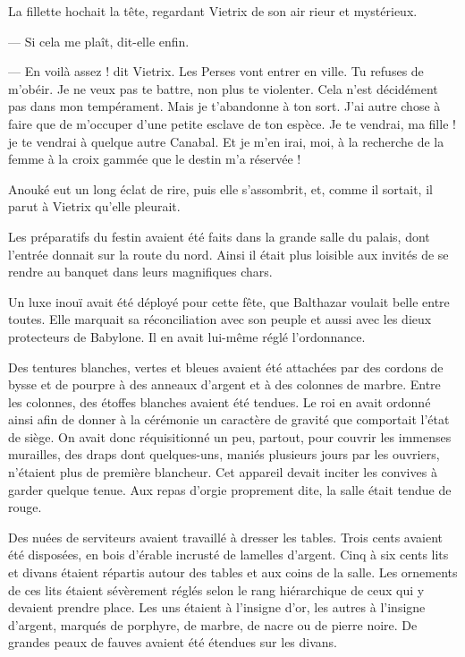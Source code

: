 \documentclass[a4paper, 11pt, oneside, polutonikogreek, french]{article}
\begin{document}
La fillette hochait la tête, regardant Vietrix de son air rieur et mystérieux.

--- Si cela me plaît, dit-elle enfin.

--- En voilà assez ! dit Vietrix. Les Perses vont entrer en ville. Tu refuses de m'obéir. Je ne veux pas te battre, non plus te violenter. Cela n'est décidément pas dans mon tempérament. Mais je t'abandonne à ton sort. J'ai autre chose à faire que de m'occuper d'une petite esclave de ton espèce. Je te vendrai, ma fille ! je te vendrai à quelque autre Canabal. Et je m'en irai, moi, à la recherche de la femme à la croix gammée que le destin m'a réservée !

Anouké eut un long éclat de rire, puis elle s'assombrit, et, comme il sortait, il parut à Vietrix qu'elle pleurait.

\bigskip
\centerline{\EightStarTaper}
\centerline{\EightStarTaper\EightStarTaper}
\bigskip

Les préparatifs du festin avaient été faits dans la grande salle du palais, dont l'entrée donnait sur la route du nord. Ainsi il était plus loisible aux invités de se rendre au banquet dans leurs magnifiques chars.

Un luxe inouï avait été déployé pour cette fête, que Balthazar voulait belle entre toutes. Elle marquait sa réconciliation avec son peuple et aussi avec les dieux protecteurs de Babylone. Il en avait lui-même réglé l'ordonnance.

Des tentures blanches, vertes et bleues avaient été attachées par des cordons de bysse et de pourpre à des anneaux d'argent et à des colonnes de marbre. Entre les colonnes, des étoffes blanches avaient été tendues. Le roi en avait ordonné ainsi afin de donner à la cérémonie un caractère de gravité que comportait l'état de siège. On avait donc réquisitionné un peu, partout, pour couvrir les immenses murailles, des draps dont quelques-uns, maniés plusieurs jours par les ouvriers, n'étaient plus de première blancheur. Cet appareil devait inciter les convives à garder quelque tenue. Aux repas d'orgie proprement dite, la salle était tendue de rouge.

\bigskip
\centerline{\EightStarTaper}
\centerline{\EightStarTaper\EightStarTaper}
\bigskip

Des nuées de serviteurs avaient travaillé à dresser les tables. Trois cents avaient été disposées, en bois d'érable incrusté de lamelles d'argent. Cinq à six cents lits et divans étaient répartis autour des tables et aux coins de la salle. Les ornements de ces lits étaient sévèrement réglés selon le rang hiérarchique de ceux qui y devaient prendre place. Les uns étaient à l'insigne d'or, les autres à l'insigne d'argent, marqués de porphyre, de marbre, de nacre ou de pierre noire. De grandes peaux de fauves avaient été étendues sur les divans.
\end{document}
